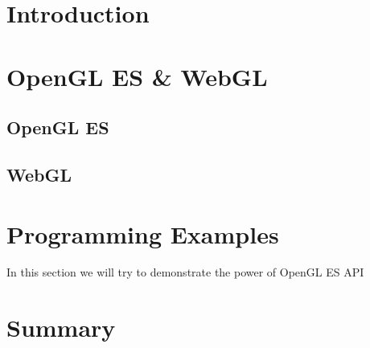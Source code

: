 \documentclass[a4paper,11pt]{article}
\begin{document}



\section{Introduction} 



\pagebreak[3]
\section{OpenGL ES \& WebGL}



%

\pagebreak[3] 
\subsection{OpenGL ES}


\pagebreak[3] 
\subsection{WebGL}


\clearpage 
\section{Programming Examples} 

In this section we will try to demonstrate the power of OpenGL ES API




\section{Summary} 


\clearpage
\label{Bibliography} 
%

 
%
\end{document}
